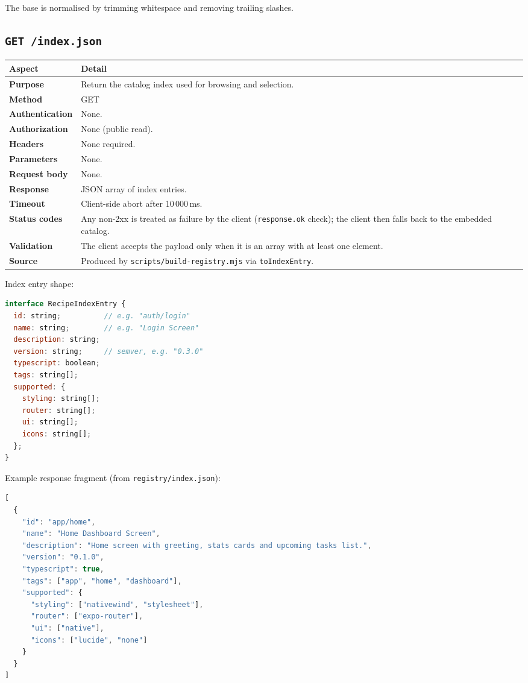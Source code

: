 The base is normalised by trimming whitespace and removing trailing slashes.

\subsection*{\texttt{GET /index.json}}

\begin{longtable}{@{}L{3.4cm}L{10.8cm}@{}}
\toprule
\textbf{Aspect} & \textbf{Detail} \\
\midrule
\textbf{Purpose} & Return the catalog index used for browsing and selection. \\
\textbf{Method} & GET \\
\textbf{Authentication} & None. \\
\textbf{Authorization} & None (public read). \\
\textbf{Headers} & None required. \\
\textbf{Parameters} & None. \\
\textbf{Request body} & None. \\
\textbf{Response} & JSON array of index entries. \\
\textbf{Timeout} & Client-side abort after 10\,000\,ms. \\
\textbf{Status codes} & Any non-2xx is treated as failure by the client
(\texttt{response.ok} check); the client then falls back to the embedded catalog. \\
\textbf{Validation} & The client accepts the payload only when it is an array with
at least one element. \\
\textbf{Source} & Produced by \texttt{scripts/build-registry.mjs} via
\texttt{toIndexEntry}. \\
\bottomrule
\end{longtable}

Index entry shape:

\begin{lstlisting}[language=JavaScript]
interface RecipeIndexEntry {
  id: string;          // e.g. "auth/login"
  name: string;        // e.g. "Login Screen"
  description: string;
  version: string;     // semver, e.g. "0.3.0"
  typescript: boolean;
  tags: string[];
  supported: {
    styling: string[];
    router: string[];
    ui: string[];
    icons: string[];
  };
}
\end{lstlisting}

Example response fragment (from \texttt{registry/index.json}):

\begin{lstlisting}[language=JavaScript]
[
  {
    "id": "app/home",
    "name": "Home Dashboard Screen",
    "description": "Home screen with greeting, stats cards and upcoming tasks list.",
    "version": "0.1.0",
    "typescript": true,
    "tags": ["app", "home", "dashboard"],
    "supported": {
      "styling": ["nativewind", "stylesheet"],
      "router": ["expo-router"],
      "ui": ["native"],
      "icons": ["lucide", "none"]
    }
  }
]
\end{lstlisting}

